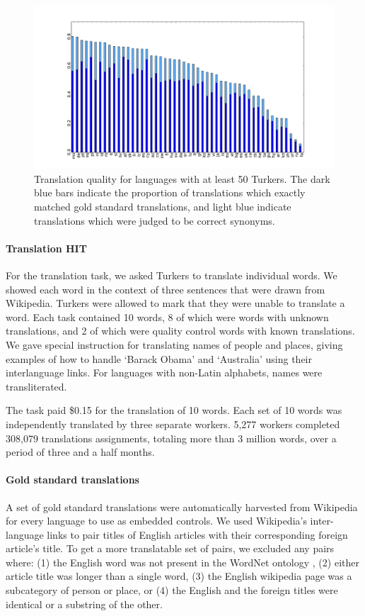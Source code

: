 \documentclass[11pt]{article}
\begin{document}
\begin{figure}[h]
\begin{center}
\includegraphics[width=0.8\linewidth]{final-figures/quality-bar}
\caption{Translation quality for languages with at least 50 Turkers.  The dark blue bars indicate the proportion of translations which exactly matched gold standard translations, and light blue indicate translations which were judged to be correct synonyms.}
\label{hitlangqual} 
\end{center}
\end{figure}



\paragraph{Translation HIT}

For the translation task, we asked Turkers to translate individual words.  We showed each word in the context of three sentences that were drawn from Wikipedia.  
Turkers were allowed to mark that they were unable to translate a word. Each task contained 10 words, 8 of which were words with unknown translations, and 2 of which were quality control words with known translations.   
We gave special instruction for translating names of people and places, giving examples of how to handle `Barack Obama' and `Australia' using their interlanguage links. For languages with non-Latin alphabets, names were transliterated. 

The task paid \$0.15 for the translation of 10 words.  
Each set of 10 words was independently translated by three separate workers.  5,277 workers completed 308,079 translations assignments, totaling more than 3 million words, over a period of three and a half months.

\paragraph{Gold standard translations} 
A set of gold standard translations were automatically harvested from Wikipedia  for every language to use as embedded controls. We used Wikipedia's inter-language links to pair titles of English articles with their corresponding foreign article's title.  To get a more translatable set of pairs, we excluded any pairs where: (1) the English word was not present in the WordNet ontology  \cite{miller1995wordnet}, (2) either article title was longer than a single word, (3) the English wikipedia page was a subcategory of person or place, or (4) the English and the foreign titles were identical or a substring of the other.
\end{document}
